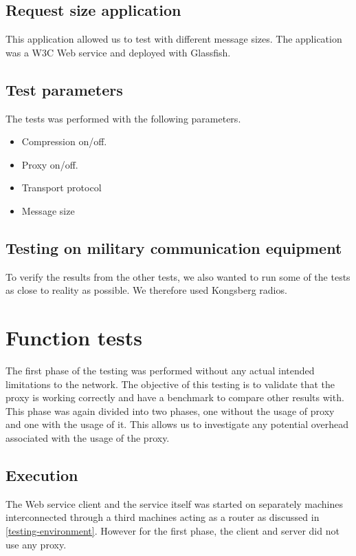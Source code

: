 \subsection{Request size application}

This application allowed us to test with different message sizes. The application was a W3C Web service and deployed with Glassfish. 


\subsection{Test parameters}

The tests was performed with the following parameters.

\begin{itemize}
	\item Compression on/off.
	\item Proxy on/off.
    \item Transport protocol
    \item Message size
\end{itemize}

\subsection{Testing on military communication equipment}

To verify the results from the other tests, we also wanted to run some of the
tests as close to reality as possible. We therefore used Kongsberg radios.

\section{Function tests}

The first phase of the testing was performed without any actual intended
limitations to the network. The objective of this testing is to validate that
the proxy is working correctly and have a benchmark to compare other results
with. This phase was again divided into two phases, one without the usage of
proxy and one with the usage of it. This allows us to investigate any potential
overhead associated with the usage of the proxy.

\subsection{Execution}

The Web service client and the service itself was started on separately machines
interconnected through a third machines acting as a router as discussed in
\cref{testing-environment}. However for the first phase, the client and server
did not use any proxy.

